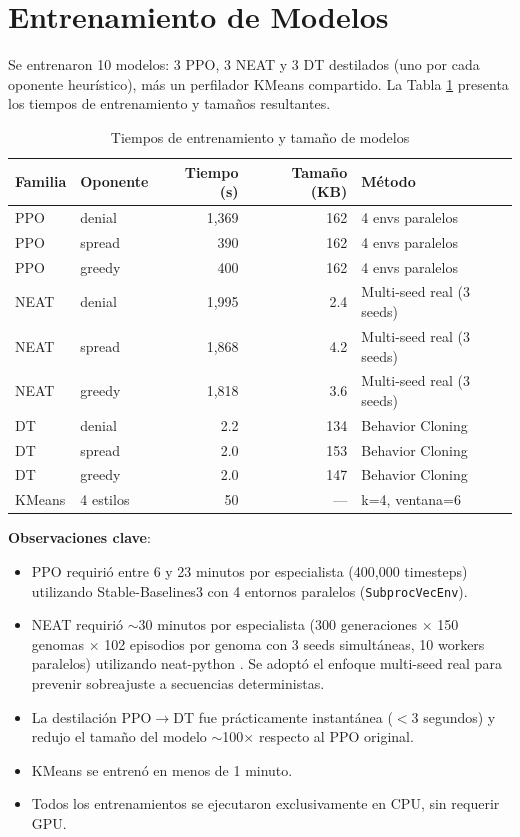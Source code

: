 \section{Entrenamiento de Modelos}

Se entrenaron 10 modelos: 3 PPO, 3 NEAT y 3 DT destilados (uno por cada oponente heurístico), más un perfilador KMeans compartido. La Tabla \ref{tab:training_times} presenta los tiempos de entrenamiento y tamaños resultantes.

\begin{table}[H]
\centering
\caption{Tiempos de entrenamiento y tamaño de modelos}
\begin{tabular}{llrrl}
\hline
\textbf{Familia} & \textbf{Oponente} & \textbf{Tiempo (s)} & \textbf{Tamaño (KB)} & \textbf{Método} \\
\hline
PPO  & denial  & 1,369  & 162 & 4 envs paralelos \\
PPO  & spread  & 390    & 162 & 4 envs paralelos \\
PPO  & greedy  & 400    & 162 & 4 envs paralelos \\
NEAT & denial  & 1,995  & 2.4 & Multi-seed real (3 seeds) \\
NEAT & spread  & 1,868  & 4.2 & Multi-seed real (3 seeds) \\
NEAT & greedy  & 1,818  & 3.6 & Multi-seed real (3 seeds) \\
DT   & denial  & 2.2    & 134 & Behavior Cloning \\
DT   & spread  & 2.0    & 153 & Behavior Cloning \\
DT   & greedy  & 2.0    & 147 & Behavior Cloning \\
KMeans & 4 estilos & 50  & ---  & k=4, ventana=6 \\
\hline
\end{tabular}
\label{tab:training_times}
\end{table}

\textbf{Observaciones clave}:

\begin{itemize}
    \item PPO requirió entre 6 y 23 minutos por especialista (400,000 timesteps) utilizando Stable-Baselines3 \cite{raffin2021sb3} con 4 entornos paralelos (\texttt{SubprocVecEnv}).
    \item NEAT requirió $\sim$30 minutos por especialista (300 generaciones $\times$ 150 genomas $\times$ 102 episodios por genoma con 3 seeds simultáneas, 10 workers paralelos) utilizando neat-python \cite{neatpython2023}. Se adoptó el enfoque multi-seed real para prevenir sobreajuste a secuencias deterministas.
    \item La destilación PPO$\to$DT fue prácticamente instantánea ($<$3 segundos) y redujo el tamaño del modelo $\sim$100$\times$ respecto al PPO original.
    \item KMeans se entrenó en menos de 1 minuto.
    \item Todos los entrenamientos se ejecutaron exclusivamente en CPU, sin requerir GPU.
\end{itemize}

